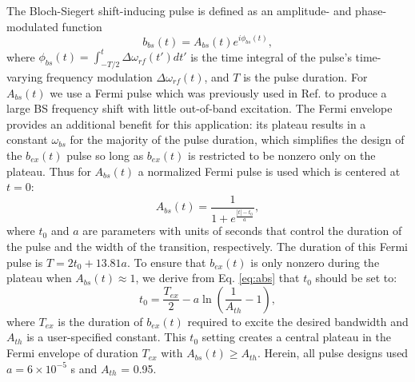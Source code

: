 \documentclass[a4paper,12pt]{article}
\newcommand{\bext}{b_{ex}(t)}
\newcommand{\bbst}{b_{bs}(t)}
\begin{document}
\par The Bloch-Siegert shift-inducing pulse is defined as an amplitude- and phase-modulated function
\begin{equation*}
    \bbst = A_{bs}(t)e^{i \phi_{bs}(t)},
\end{equation*}
where $\phi_{bs}(t) = \int_{-T/2}^{t} \Delta\omega_{rf}(t') dt'$ 
is the time integral of the pulse's time-varying frequency modulation $\Delta \omega_{rf}(t)$,
and $T$ is the pulse duration. 
For $A_{bs}(t)$ we use a Fermi pulse
which was previously used in Ref. \cite{Sacolick2010B1Shift}   
to produce a large BS frequency shift with little out-of-band excitation. 
The Fermi envelope provides an additional benefit for this application: 
its plateau results in a constant
$\omega_{bs}$ for the majority of the pulse duration, 
which simplifies the design of the $\bext$ pulse
so long as $\bext$ is restricted to be nonzero only on the plateau.
Thus for $A_{bs}(t)$ a normalized Fermi pulse is used which is  
centered at $t=0$:
\begin{equation}
    A_{bs}(t) =     	\frac{1}{1+e^{\frac{|t|-t_0}{a}}},
    \label{eq:abs}
\end{equation}
where $t_0$ and $a$ are parameters with units of seconds 
that control the duration of the pulse and the width of the transition, respectively. The duration of this Fermi pulse is $T = 2 t_0 + 13.81 a$.
To ensure that $\bext$ is only nonzero during the plateau when $A_{bs}(t) \approx 1$, 
we derive from Eq. \ref{eq:abs} that $t_0$ should be set to:
\begin{equation*}
    t_0 = \frac{T_{ex}}{2}-a\ln{\left(\frac{1}{A_{th}}-1\right)},
\end{equation*} 
where $T_{ex}$ is the duration of $\bext$ required to excite the desired bandwidth
and $A_{th}$ is a user-specified constant. 
This $t_0$ setting 
creates a central plateau in the Fermi envelope of duration $T_{ex}$ with $A_{bs}(t) \geq A_{th}$. 
Herein, all pulse designs used $a = 6\times10^{-5}$ s and $A_{th}$ = 0.95.
\end{document}
